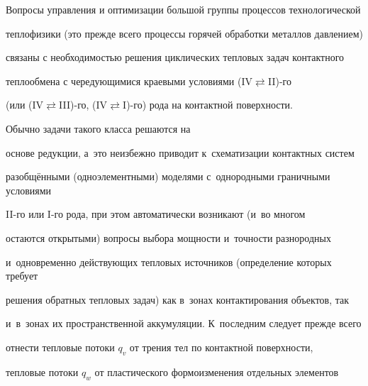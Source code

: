 


\maketitle





Вопросы управления и оптимизации большой группы процессов технологической 

теплофизики (это прежде всего процессы горячей обработки металлов давлением) 

связаны с необходимостью решения циклических тепловых задач контактного 

теплообмена с чередующимися краевыми условиями (IV$\rightleftarrows$II)-го 

(или (IV$\rightleftarrows$III)-го, (IV$\rightleftarrows$I)-го) рода на контактной поверхности. 

Обычно задачи такого класса решаются на 

основе редукции, а~это неизбежно приводит к~схематизации контактных систем 

разобщёнными (одноэлементными) моделями с~однородными граничными условиями 

II-го или I-го рода, при этом автоматически возникают (и~во многом 

остаются открытыми) вопросы выбора мощности и~точности разнородных 

и~одновременно действующих тепловых источников (определение которых требует 

решения обратных тепловых задач) как в~зонах контактирования объектов, так 

и~в~зонах их пространственной аккумуляции. К~последним следует прежде всего 

отнести тепловые потоки $q_v$ от трения тел по контактной поверхности, 

тепловые потоки $q_w$ от пластического формоизменения отдельных элементов 

